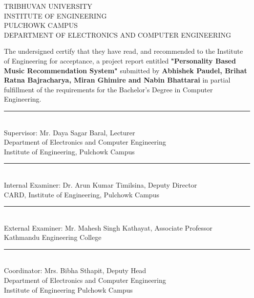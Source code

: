 
\newpage
\setcounter{page}{2}

\begin{center}
  TRIBHUVAN UNIVERSITY\\
  INSTITUTE OF ENGINEERING\\
  PULCHOWK CAMPUS\\
  DEPARTMENT OF ELECTRONICS AND COMPUTER ENGINEERING\\
\end{center}
The undersigned certify that they have read, and recommended to the Institute of Engineering for acceptance, a project report entitled \textbf{ "Personality Based Music Recommendation System"} submitted by \textbf{Abhishek Paudel, Brihat Ratna Bajracharya, Miran Ghimire and Nabin Bhattarai} in partial fulfillment of the requirements for the Bachelor's Degree in Computer Engineering.\\[1.1cm]

\begin{minipage}{.80\textwidth}
\rule{1\textwidth}{1pt}\\
Supervisor: Mr. Daya Sagar Baral, Lecturer \\
Department of Electronics and Computer Engineering\\ Institute of Engineering, Pulchowk Campus\\[1cm]
\end{minipage}

\begin{minipage}{.80\textwidth}
\rule{1\textwidth}{1pt}\\
Internal Examiner: Dr. Arun Kumar Timilsina, Deputy Director  \\
CARD, Institute of Engineering, Pulchowk Campus\\[1.1cm]
\end{minipage}

\begin{minipage}{.80\textwidth}
\rule{1\textwidth}{1pt}\\
External Examiner: Mr. Mahesh Singh Kathayat, Associate Professor\\
Kathmandu Engineering College\\[1.1cm]
\end{minipage}

\begin{minipage}{.80\textwidth}
\rule{1\textwidth}{1pt}\\
Coordinator: Mrs. Bibha Sthapit, Deputy Head\\
Department of Electronics and Computer Engineering\\ Institute of Engineering Pulchowk Campus\\[1cm]
\end{minipage}


